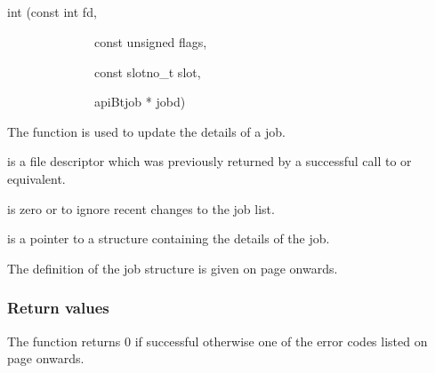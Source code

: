 \subsection{\funcnameXBjobupd{}}

\begin{expara}

int \funcnameXBjobupd{}(const int fd,

\ \ \ \ \ \ \ \ \ \ \ \ \ \ const unsigned flags,

\ \ \ \ \ \ \ \ \ \ \ \ \ \ const slotno\_t slot,

\ \ \ \ \ \ \ \ \ \ \ \ \ \ apiBtjob * jobd)

\end{expara}

The function \funcXBjobupd{} is used to update the
details of a job.

 is a file descriptor which was previously
returned by a successful call to \funcXBopen{} or equivalent.

 is zero or
 to ignore recent changes to
the job list.

 is a pointer to a structure containing the
details of the job.

The definition of the job structure is given on page
\pageref{bkm:Jobstructure} onwards.

\subsubsection{Return values}
The function returns 0 if successful otherwise one of the error codes
listed on page \pageref{errorcodes} onwards.

